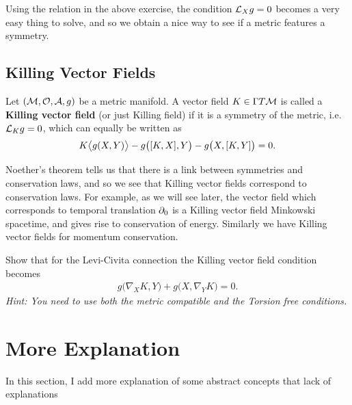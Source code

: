 \documentclass[12pt]{article} %
\begin{document}
Using the relation in the above exercise, the condition $\mathcal{L}_Xg=0$ becomes a very easy thing to solve, and so we obtain a nice way to see if a metric features a symmetry. 

\subsection{Killing Vector Fields}

    Let $(\mathcal{M},\mathcal{O},\mathcal{A},g)$ be a metric manifold. A vector field $K\in\Gamma T\mathcal{M}$ is called a \textbf{Killing vector field} (or just Killing field) if it is a symmetry of the metric, i.e. $\mathcal{L}_Kg = 0$, which can equally be written as 
    \begin{align*} 
        K\big\langle g(X,Y)\big\rangle - g\big([K,X],Y\big) - g\big(X,[K,Y]\big) = 0.
    \end{align*} 
\ed 

Noether's theorem tells us that there is a link between symmetries and conservation laws, and so we see that Killing vector fields correspond to conservation laws. For example, as we will see later, the vector field which corresponds to temporal translation $\partial_0$ is a Killing vector field Minkowski spacetime, and gives rise to conservation of energy. Similarly we have Killing vector fields for momentum conservation. 

\bbox 
    Show that for the Levi-Civita connection the Killing vector field condition becomes 
    \begin{align*} 
        g\big(\nabla_XK,Y\big) + g\big(X,\nabla_YK\big) = 0.
    \end{align*} 
    \textit{Hint: You need to use both the metric compatible and the Torsion free conditions.}
\ebox 


\section{More Explanation}
In this section, I add more explanation of some abstract concepts that lack of explanations
\end{document}
